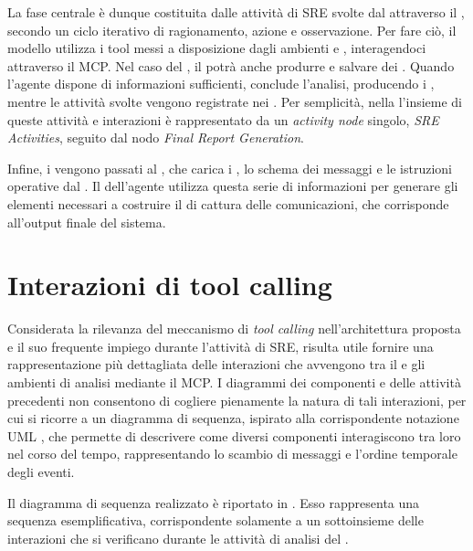 La fase centrale è dunque costituita dalle attività di SRE svolte dal \sreagent{} attraverso il \llm{}, secondo un ciclo iterativo di ragionamento, azione e osservazione. Per fare ciò, il modello utilizza i tool messi a disposizione dagli ambienti \sreframework{} e \sandbox{}, interagendoci attraverso il MCP. Nel caso del \sandbox{}, il \llm{} potrà anche produrre e salvare dei \file{}. Quando l'agente dispone di informazioni sufficienti, conclude l'analisi, producendo i \report{}, mentre le attività svolte vengono registrate nei \logs{}. Per semplicità, nella  l'insieme di queste attività e interazioni è rappresentato da un \emph{activity node} singolo, \emph{SRE Activities}, seguito dal nodo \emph{Final Report Generation}.

Infine, i \report{} vengono passati al \codeagent{}, che carica i \templates{}, lo schema dei messaggi e le istruzioni operative dal \prompt{}. Il \llm{} dell'agente utilizza questa serie di informazioni per generare gli elementi necessari a costruire il \capture{} di cattura delle comunicazioni, che corrisponde all'output finale del sistema.

\section{Interazioni di tool calling} %

Considerata la rilevanza del meccanismo di \emph{tool calling} nell'architettura proposta e il suo frequente impiego durante l'attività di SRE, risulta utile fornire una rappresentazione più dettagliata delle interazioni che avvengono tra il \sreagent{} e gli ambienti di analisi mediante il MCP. I diagrammi dei componenti e delle attività precedenti non consentono di cogliere pienamente la natura di tali interazioni, per cui si ricorre a un diagramma di sequenza, ispirato alla corrispondente notazione UML \cite{omg2017uml}, che permette di descrivere come diversi componenti interagiscono tra loro nel corso del tempo, rappresentando lo scambio di messaggi e l'ordine temporale degli eventi. %

Il diagramma di sequenza realizzato è riportato in . Esso rappresenta una sequenza esemplificativa, corrispondente solamente a un sottoinsieme delle interazioni che si verificano durante le attività di analisi del \sreagent{}.



